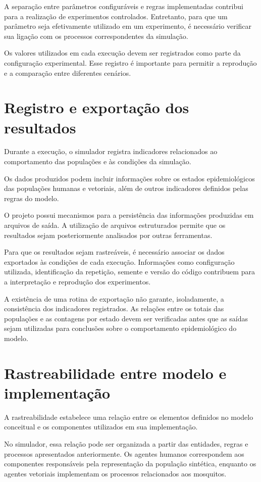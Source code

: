 A separação entre parâmetros configuráveis e regras implementadas contribui para a realização de experimentos controlados. Entretanto, para que um parâmetro seja efetivamente utilizado em um experimento, é necessário verificar sua ligação com os processos correspondentes da simulação.

Os valores utilizados em cada execução devem ser registrados como parte da configuração experimental. Esse registro é importante para permitir a reprodução e a comparação entre diferentes cenários.

\section{Registro e exportação dos resultados}

Durante a execução, o simulador registra indicadores relacionados ao comportamento das populações e às condições da simulação.

Os dados produzidos podem incluir informações sobre os estados epidemiológicos das populações humanas e vetoriais, além de outros indicadores definidos pelas regras do modelo.

O projeto possui mecanismos para a persistência das informações produzidas em arquivos de saída. A utilização de arquivos estruturados permite que os resultados sejam posteriormente analisados por outras ferramentas.

Para que os resultados sejam rastreáveis, é necessário associar os dados exportados às condições de cada execução. Informações como configuração utilizada, identificação da repetição, semente e versão do código contribuem para a interpretação e reprodução dos experimentos.

A existência de uma rotina de exportação não garante, isoladamente, a consistência dos indicadores registrados. As relações entre os totais das populações e as contagens por estado devem ser verificadas antes que as saídas sejam utilizadas para conclusões sobre o comportamento epidemiológico do modelo.

\section{Rastreabilidade entre modelo e implementação}

A rastreabilidade estabelece uma relação entre os elementos definidos no modelo conceitual e os componentes utilizados em sua implementação.

No simulador, essa relação pode ser organizada a partir das entidades, regras e processos apresentados anteriormente. Os agentes humanos correspondem aos componentes responsáveis pela representação da população sintética, enquanto os agentes vetoriais implementam os processos relacionados aos mosquitos.

